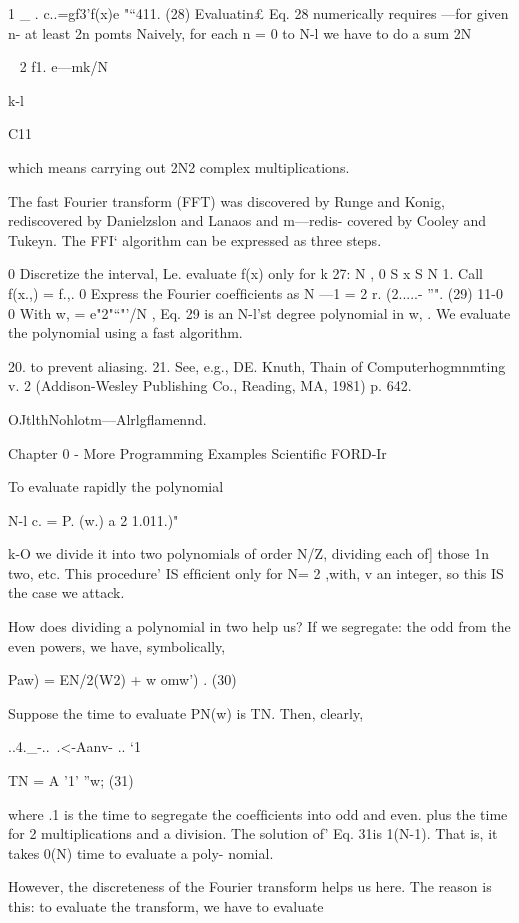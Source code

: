 1 _ .
c..=gf3'f(x)e "“411. (28)
Evaluatin£ Eq. 28 numerically requires —for given n- at least
2n pomts Naively, for each n = 0 to N-l we have to do a sum
2N

~ 2 f1. e—mk/N

k-l

C11

which means carrying out 2N2 complex multiplications.

The fast Fourier transform (FFT) was discovered by Runge and
Konig, rediscovered by Danielzslon and Lanaos and m—redis-
covered by Cooley and Tukeyn. The FFI‘ algorithm can be
expressed as three steps.

0 Discretize the interval, Le. evaluate f(x) only for
k
27: N , 0 S x S N 1.
Call f(x.,) = f.,.
0 Express the Fourier coefﬁcients as
N —1
= 2 r. (2.....- ”". (29)
11-0
0 With w, = e"2"“"'/N , Eq. 29 is an N-l’st degree polynomial in
w, . We evaluate the polynomial using a fast algorithm.

 

20. to prevent aliasing.
21. See, e.g., DE. Knuth, Thain of Computerhogmnmting v. 2 (Addison-Wesley Publishing Co.,
Reading, MA, 1981) p. 642.

OJtlthNohlotm—Alrlgﬂamennd.

Chapter 0 - More Programming Examples Scientific FORD-Ir

To evaluate rapidly the polynomial

N-l
c. = P. (w.) a 2 1.011.)"

k-O
we divide it into two polynomials of order N/Z, dividing each of]
those 1n two, etc. This procedure' IS efﬁcient only for N= 2 ,with,
v an integer, so this IS the case we attack.

How does dividing a polynomial in two help us? If we segregate:
the odd from the even powers, we have, symbolically,

Paw) = EN/2(W2) + w omw’) . (30)

 

Suppose the time to evaluate PN(w) is TN. Then, clearly,

..4._-..~.<-Aanv- .. ‘1

TN = A '1' ”w; (31)

where .1 is the time to segregate the coefﬁcients into odd and even.
plus the time for 2 multiplications and a division. The solution of’
Eq. 31is 1(N-1). That is, it takes 0(N) time to evaluate a poly-
nomial.

However, the discreteness of the Fourier transform helps us here.
The reason is this: to evaluate the transform, we have to evaluate


